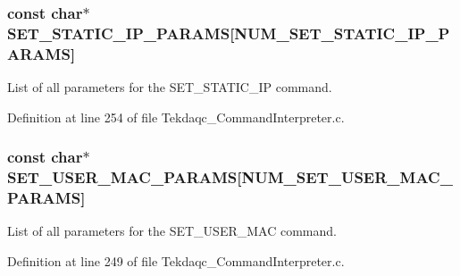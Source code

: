 \hypertarget{group__command__interpreter_ga27977b5ae6f92883015ee0cb83d54617}{
\subsubsection[{S\-E\-T\-\_\-\-S\-T\-A\-T\-I\-C\-\_\-\-I\-P\-\_\-\-P\-A\-R\-A\-M\-S}]{\setlength{\rightskip}{0pt plus 5cm}const char$\ast$ S\-E\-T\-\_\-\-S\-T\-A\-T\-I\-C\-\_\-\-I\-P\-\_\-\-P\-A\-R\-A\-M\-S\mbox{[}{\bf N\-U\-M\-\_\-\-S\-E\-T\-\_\-\-S\-T\-A\-T\-I\-C\-\_\-\-I\-P\-\_\-\-P\-A\-R\-A\-M\-S}\mbox{]}}}\label{group__command__interpreter_ga27977b5ae6f92883015ee0cb83d54617}
List of all parameters for the S\-E\-T\-\_\-\-S\-T\-A\-T\-I\-C\-\_\-\-I\-P command. 

Definition at line 254 of file Tekdaqc\-\_\-\-Command\-Interpreter.\-c.

\hypertarget{group__command__interpreter_gac5a3a40f966d23af1d572909c1d8e952}{
\subsubsection[{S\-E\-T\-\_\-\-U\-S\-E\-R\-\_\-\-M\-A\-C\-\_\-\-P\-A\-R\-A\-M\-S}]{\setlength{\rightskip}{0pt plus 5cm}const char$\ast$ S\-E\-T\-\_\-\-U\-S\-E\-R\-\_\-\-M\-A\-C\-\_\-\-P\-A\-R\-A\-M\-S\mbox{[}{\bf N\-U\-M\-\_\-\-S\-E\-T\-\_\-\-U\-S\-E\-R\-\_\-\-M\-A\-C\-\_\-\-P\-A\-R\-A\-M\-S}\mbox{]}}}\label{group__command__interpreter_gac5a3a40f966d23af1d572909c1d8e952}
List of all parameters for the S\-E\-T\-\_\-\-U\-S\-E\-R\-\_\-\-M\-A\-C command. 

Definition at line 249 of file Tekdaqc\-\_\-\-Command\-Interpreter.\-c.

